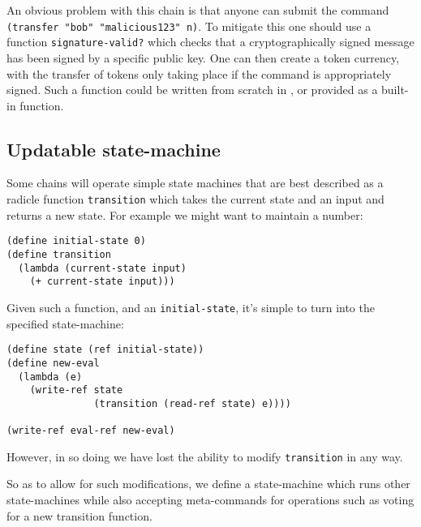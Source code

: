 An obvious problem with this chain is that anyone can submit the command
\texttt{(transfer "bob" "malicious123" n)}. To mitigate this one should use a
function \texttt{signature-valid?} which checks that a cryptographically signed
message has been signed by a specific public key. One can then create a token
currency, with the transfer of tokens only taking place if the command is
appropriately signed. Such a function could be written from scratch in \rad{},
or provided as a built-in function.

\subsection{Updatable state-machine}

Some chains will operate simple state machines that are best described as a
radicle function \texttt{transition} which takes the current state and an input
and returns a new state. For example we might want to maintain a number:
\begin{lstlisting}
(define initial-state 0)
(define transition
  (lambda (current-state input)
    (+ current-state input)))
\end{lstlisting}
Given such a function, and an \texttt{initial-state}, it's simple to turn
\rad{} into the specified state-machine:
\begin{lstlisting}
(define state (ref initial-state))
(define new-eval
  (lambda (e)
    (write-ref state
               (transition (read-ref state) e))))

(write-ref eval-ref new-eval)
\end{lstlisting}

However, in so doing we have lost the ability to modify \texttt{transition} in
any way.

So as to allow for such modifications, we define a state-machine which runs other
state-machines while also accepting meta-commands for operations such as voting
for a new transition function.

